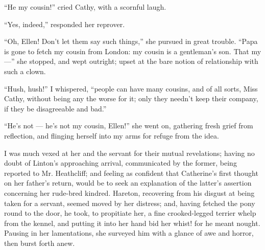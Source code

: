 \par “He my cousin!” cried Cathy, with a scornful laugh.
\par “Yes, indeed,” responded her reprover.
\par “Oh, Ellen! Don't let them say such things,” she pursued in great trouble. “Papa is gone to fetch my cousin from London: my cousin is a gentleman's son. That my —” she stopped, and wept outright; upset at the bare notion of relationship with such a clown.
\par “Hush, hush!” I whispered, “people can have many cousins, and of all sorts, Miss Cathy, without being any the worse for it; only they needn't keep their company, if they be disagreeable and bad.”
\par “He's not — he's not my cousin, Ellen!” she went on, gathering fresh grief from reflection, and flinging herself into my arms for refuge from the idea.
\par I was much vexed at her and the servant for their mutual revelations; having no doubt of Linton's approaching arrival, communicated by the former, being reported to Mr. Heathcliff; and feeling as confident that Catherine's first thought on her father's return, would be to seek an explanation of the latter's assertion concerning her rude-bred kindred. Hareton, recovering from his disgust at being taken for a servant, seemed moved by her distress; and, having fetched the pony round to the door, he took, to propitiate her, a fine crooked-legged terrier whelp from the kennel, and putting it into her hand bid her whist! for he meant nought. Pausing in her lamentations, she surveyed him with a glance of awe and horror, then burst forth anew.
